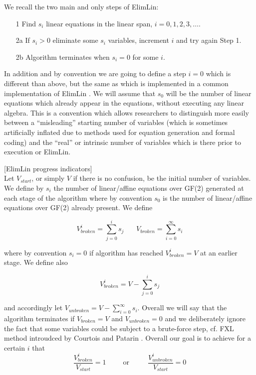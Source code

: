 We recall the two main and only steps of ElimLin:

\begin{enumerate}
	\item[1] Find $s_i$ linear equations in the linear span, $i=0,1,2,3,\ldots$.
	\item[2a] If $s_i>0$ eliminate some $s_i$ variables,
	increment $i$ and try again Step 1.
	\item[2b] Algorithm terminates when $s_i=0$ for some $i$.
\end{enumerate}

In addition and by convention we are going to define a step $i=0$ which is different than
above, but the same as which is implemented in a common implementation of ElimLin \cite{CourtoisSoftware}.
We will assume that $s_0$ will be the number of linear equations which already appear in the equations,
without executing any linear algebra. This is a convention which allows researchers to distinguish
more easily between a ``misleading'' starting number of variables (which is sometimes artificially inflated due to
methods used for equation generation and formal coding)
and the ``real'' or intrinsic number of variables which is there prior to execution or ElimLin.

\begin{mydef}\label{ElimLinProgressParams}
	[ElimLin progress indicators]\\
	Let $V_{start}$, or simply $V$ if there is no confusion,
	be the initial number of variables.
	We define by $s_i$ the number of
	linear/affine equations over GF(2)
	generated at each stage of the algorithm
	where by convention $s_0$ is the number of
	linear/affine equations over GF(2) already present.
	We define
	
	\begin{equation}
	V^i_{broken}=\sum_{j=0}^{i} s_j ~~~~~~~~V_{broken}=\sum_{i=0}^{\infty} s_i
	\end{equation}
	
	where by convention $s_i=0$ if algorithm has reached
	$V^i_{broken}=V$ at an earlier stage.
	We define also
	
	\begin{equation} \label{EQ:unborken}
	V^i_{broken}=V-\sum_{j=0}^{i} s_j
	\end{equation}
	
	and accordingly let
	$
	V_{unbroken}=V-\sum_{i=0}^{\infty} s_i.
	$
	Overall we will say that the algorithm terminates if
	$V_{broken}=V$ and $V_{unbroken}=0$ and we deliberately ignore the fact that
	some variables could be subject to a brute-force step,
	cf. FXL method introudced by Courtois and Patarin \cite{XL2}.
	Overall our goal is to achieve for a certain $i$ that
	\begin{equation}
	\frac{V^i_{broken}}{V_{start}}=1
	~~~~~~~~~~~\mbox{or}~~~~~~~~~~~~
	\frac{V^i_{unbroken}}{V_{start}}=0
	\end{equation}
	
\end{mydef}

